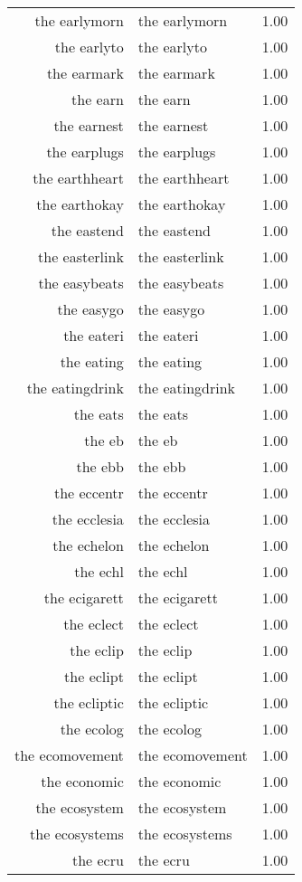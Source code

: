 \begin{table}[ht]
\begin{tabular}{rlr}
  the earlymorn & the earlymorn & 1.00 \\ 
  the earlyto & the earlyto & 1.00 \\ 
  the earmark & the earmark & 1.00 \\ 
  the earn & the earn & 1.00 \\ 
  the earnest & the earnest & 1.00 \\ 
  the earplugs & the earplugs & 1.00 \\ 
  the earthheart & the earthheart & 1.00 \\ 
  the earthokay & the earthokay & 1.00 \\ 
  the eastend & the eastend & 1.00 \\ 
  the easterlink & the easterlink & 1.00 \\ 
  the easybeats & the easybeats & 1.00 \\ 
  the easygo & the easygo & 1.00 \\ 
  the eateri & the eateri & 1.00 \\ 
  the eating & the eating & 1.00 \\ 
  the eatingdrink & the eatingdrink & 1.00 \\ 
  the eats & the eats & 1.00 \\ 
  the eb & the eb & 1.00 \\ 
  the ebb & the ebb & 1.00 \\ 
  the eccentr & the eccentr & 1.00 \\ 
  the ecclesia & the ecclesia & 1.00 \\ 
  the echelon & the echelon & 1.00 \\ 
  the echl & the echl & 1.00 \\ 
  the ecigarett & the ecigarett & 1.00 \\ 
  the eclect & the eclect & 1.00 \\ 
  the eclip & the eclip & 1.00 \\ 
  the eclipt & the eclipt & 1.00 \\ 
  the ecliptic & the ecliptic & 1.00 \\ 
  the ecolog & the ecolog & 1.00 \\ 
  the ecomovement & the ecomovement & 1.00 \\ 
  the economic & the economic & 1.00 \\ 
  the ecosystem & the ecosystem & 1.00 \\ 
  the ecosystems & the ecosystems & 1.00 \\ 
  the ecru & the ecru & 1.00 \\ 

\end{tabular}
\end{table}
